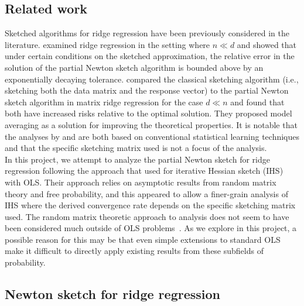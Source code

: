 \subsection{Related work} \label{sec:literature}

Sketched algorithms for ridge regression have been previously considered in the literature. \citet{Chowdhury:2018} examined ridge regression in the setting where $n\ll d$ and showed that under certain conditions on the sketched approximation, the relative error in the solution of the partial Newton sketch algorithm is bounded above by an exponentially decaying tolerance. \citet{Wang:2017} compared the classical sketching algorithm (i.e., sketching both the data matrix and the response vector) to the partial Newton sketch algorithm in matrix ridge regression for the case $d\ll n$ and found that both have increased risks relative to the optimal solution. They proposed model averaging as a solution for improving the theoretical properties. It is notable that the analyses by \citet{Chowdhury:2018} and \citet{Wang:2017} are both based on conventional statistical learning techniques and that the specific sketching matrix used is not a focus of the analysis.
\\

In this project, we attempt to analyze the partial Newton sketch for ridge regression following the approach that \citet{Lacotte:2020} used for iterative Hessian sketch (IHS) with OLS. Their approach relies on asymptotic results from random matrix theory and free probability, and this appeared to allow a finer-grain analysis of IHS where the derived convergence rate depends on the specific sketching matrix used. The random matrix theoretic approach to analysis does not seem to have been considered much outside of OLS problems~\citep{Dobriban:2019,Lacotte:2020b}. As we explore in this project, a possible reason for this may be that even simple extensions to standard OLS make it difficult to directly apply existing results from these subfields of probability.


\subsection{Newton sketch for ridge regression} \label{sec:ridgesketch}

